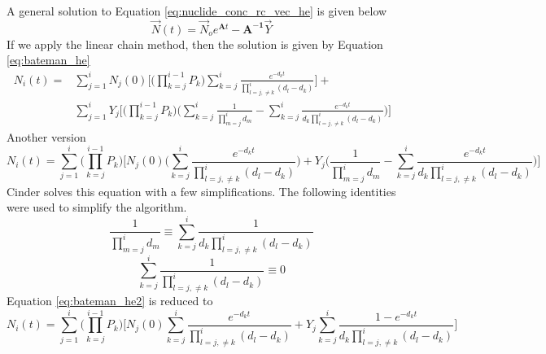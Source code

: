 A general solution to Equation \ref{eq:nuclide_conc_rc_vec_he} is given below
\begin{equation}\label{eq:rate_change_sol_he}
  \vec{N}(t) =\vec{N}_{o} e^{\boldsymbol{A}t }- \boldsymbol{A^{-1}} \vec{Y}
\end{equation}
If we apply the linear chain method, then the solution is given by Equation
\ref{eq:bateman_he}
\begin{equation}\label{eq:bateman_he}
  \begin{aligned}
  N_{i}(t) = &\sum_{j=1}^{i} N_{j}(0)
  \Bigg[ \Bigg( \prod_{k=j}^{i-1} P_{k} \Bigg)
  \sum_{k=j}^{i}\frac{e^{-d_{k}t}}{\displaystyle \prod_{l=j, \neq k}^{i}
  (d_{l} -d_{k})}
  \Bigg] + &&\\
  &\sum_{j=1}^{i} Y_{j} \Bigg[ \Bigg(\prod_{k=j}^{i-1} P_{k} \Bigg)
  \Bigg(\sum_{k=j}^{i} \frac{1}{\displaystyle \prod_{m=j}^{i} d_{m}} -
  \sum_{k=j}^{i} \frac{e^{-d_{k}t}}{d_{k} \displaystyle \prod_{l=j, \neq k}^{i}(d_{l} -d_{k})}
  \Bigg)\Bigg]
  \end{aligned}
\end{equation}
Another version
\begin{equation}\label{eq:bateman_he_2}
  N_{i}(t) = \sum_{j=1}^{i}
  \Bigg( \prod_{k=j}^{i-1} P_{k} \Bigg)
  \Bigg[ N_{j}(0) \Bigg(\sum_{k=j}^{i}\frac{e^{-d_{k}t}}{\displaystyle
  \prod_{l=j, \neq k}^{i}(d_{l} -d_{k})}
  \Bigg) + Y_{j}
  \Bigg( \frac{1}{\displaystyle \prod_{m=j}^{i} d_{m}} -
  \sum_{k=j}^{i} \frac{e^{-d_{k}t}}{d_{k}
  \displaystyle \prod_{l=j, \neq k}^{i}(d_{l} -d_{k})}
  \Bigg)\Bigg]
\end{equation}
Cinder solves this equation with a few simplifications. The following identities were used to
simplify the algorithm.
\begin{equation}\label{eq:simplification1}
  \frac{1}{\displaystyle \prod_{m=j}^{i} d_{m}} \equiv
  \sum_{k=j}^{i} \frac{1}{d_{k}
  \displaystyle \prod_{ l=j, \neq k}^{i}(d_{l} -d_{k})}
\end{equation}
\begin{equation}\label{eq:simplification2}
  \sum_{k=j}^{i} \frac{1}{
  \displaystyle \prod_{l=j, \neq k}^{i}(d_{l} -d_{k})} \equiv 0
\end{equation}
Equation \ref{eq:bateman_he2} is reduced to
\begin{equation}\label{eq:bateman_he_simp}
  N_{i}(t) = \sum_{j=1}^{i}
  \Bigg( \prod_{k=j}^{i-1} P_{k} \Bigg)
  \Bigg[ N_{j}(0) \sum_{k=j}^{i}\frac{e^{-d_{k}t}}{\displaystyle
  \prod_{l=j, \neq k}^{i}(d_{l} -d_{k})}
  + Y_{j}
  \sum_{k=j}^{i} \frac{1 - e^{-d_{k}t}}{d_{k}
  \displaystyle \prod_{l=j, \neq k}^{i}(d_{l} -d_{k})}
  \Bigg]
\end{equation}
